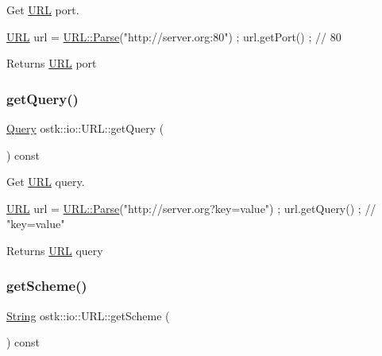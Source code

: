Get \hyperlink{classostk_1_1io_1_1_u_r_l}{U\+RL} port. 


\begin{DoxyCode}
\hyperlink{classostk_1_1io_1_1_u_r_l_a2537e046cef4ac966cc295abb81279c2}{URL} url = \hyperlink{classostk_1_1io_1_1_u_r_l_a1cd7216bb1079f62386a218ba510958d}{URL::Parse}(\textcolor{stringliteral}{"http://server.org:80"}) ;
url.getPort() ; \textcolor{comment}{// 80}
\end{DoxyCode}


\begin{DoxyReturn}{Returns}
\hyperlink{classostk_1_1io_1_1_u_r_l}{U\+RL} port 
\end{DoxyReturn}
\mbox{\label{classostk_1_1io_1_1_u_r_l_ac6ddb4ae26ba6f2cd61f3c94483d7b0f}} 
\subsubsection{\texorpdfstring{get\+Query()}{getQuery()}}
{\footnotesize\ttfamily \hyperlink{namespaceostk_1_1io_aeabc644ba5c25896df8014bd0271f970}{Query} ostk\+::io\+::\+U\+R\+L\+::get\+Query (\begin{DoxyParamCaption}{ }\end{DoxyParamCaption}) const}



Get \hyperlink{classostk_1_1io_1_1_u_r_l}{U\+RL} query. 


\begin{DoxyCode}
\hyperlink{classostk_1_1io_1_1_u_r_l_a2537e046cef4ac966cc295abb81279c2}{URL} url = \hyperlink{classostk_1_1io_1_1_u_r_l_a1cd7216bb1079f62386a218ba510958d}{URL::Parse}(\textcolor{stringliteral}{"http://server.org?key=value"}) ;
url.getQuery() ; \textcolor{comment}{// "key=value"}
\end{DoxyCode}


\begin{DoxyReturn}{Returns}
\hyperlink{classostk_1_1io_1_1_u_r_l}{U\+RL} query 
\end{DoxyReturn}
\mbox{\label{classostk_1_1io_1_1_u_r_l_a28880731bc5e0a3eb216f436ff0caac6}} 
\subsubsection{\texorpdfstring{get\+Scheme()}{getScheme()}}
{\footnotesize\ttfamily \hyperlink{namespaceostk_1_1io_a95d49b120613a7610cb1b4f03b1116b6}{String} ostk\+::io\+::\+U\+R\+L\+::get\+Scheme (\begin{DoxyParamCaption}{ }\end{DoxyParamCaption}) const}




